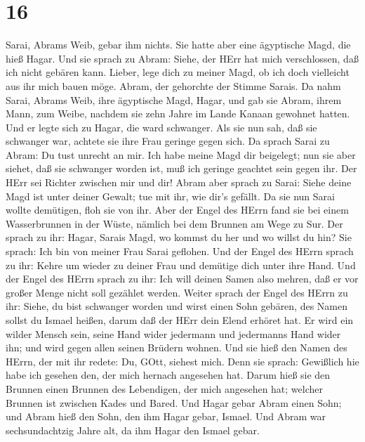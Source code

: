 \hypertarget{section-15}{%
\section{16}\label{section-15}}

 Sarai, Abrams Weib, gebar ihm nichts. Sie hatte aber eine
ägyptische Magd, die hieß Hagar.  Und sie sprach zu Abram:
Siehe, der HErr hat mich verschlossen, daß ich nicht gebären kann.
Lieber, lege dich zu meiner Magd, ob ich doch vielleicht aus ihr mich
bauen möge. Abram, der gehorchte der Stimme Sarais.  Da nahm
Sarai, Abrams Weib, ihre ägyptische Magd, Hagar, und gab sie Abram,
ihrem Mann, zum Weibe, nachdem sie zehn Jahre im Lande Kanaan gewohnet
hatten.  Und er legte sich zu Hagar, die ward schwanger. Als
sie nun sah, daß sie schwanger war, achtete sie ihre Frau geringe gegen
sich.  Da sprach Sarai zu Abram: Du tust unrecht an mir. Ich
habe meine Magd dir beigelegt; nun sie aber siehet, daß sie schwanger
worden ist, muß ich geringe geachtet sein gegen ihr. Der HErr sei
Richter zwischen mir und dir!  Abram aber sprach zu Sarai:
Siehe deine Magd ist unter deiner Gewalt; tue mit ihr, wie dir's
gefällt. Da sie nun Sarai wollte demütigen, floh sie von ihr.
 Aber der Engel des HErrn fand sie bei einem Wasserbrunnen
in der Wüste, nämlich bei dem Brunnen am Wege zu Sur.  Der
sprach zu ihr: Hagar, Sarais Magd, wo kommst du her und wo willst du
hin? Sie sprach: Ich bin von meiner Frau Sarai geflohen. 
Und der Engel des HErrn sprach zu ihr: Kehre um wieder zu deiner Frau
und demütige dich unter ihre Hand.  Und der Engel des HErrn
sprach zu ihr: Ich will deinen Samen also mehren, daß er vor großer
Menge nicht soll gezählet werden.  Weiter sprach der Engel
des HErrn zu ihr: Siehe, du bist schwanger worden und wirst einen Sohn
gebären, des Namen sollst du Ismael heißen, darum daß der HErr dein
Elend erhöret hat.  Er wird ein wilder Mensch sein, seine
Hand wider jedermann und jedermanns Hand wider ihn; und wird gegen allen
seinen Brüdern wohnen.  Und sie hieß den Namen des HErrn,
der mit ihr redete: Du, GOtt, siehest mich. Denn sie sprach: Gewißlich
hie habe ich gesehen den, der mich hernach angesehen hat. 
Darum hieß sie den Brunnen einen Brunnen des Lebendigen, der mich
angesehen hat; welcher Brunnen ist zwischen Kades und Bared.
 Und Hagar gebar Abram einen Sohn; und Abram hieß den Sohn,
den ihm Hagar gebar, Ismael.  Und Abram war sechsundachtzig
Jahre alt, da ihm Hagar den Ismael gebar.

